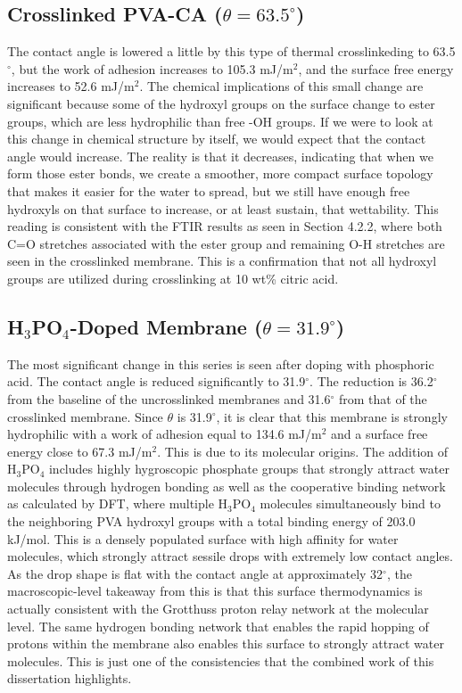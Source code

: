 \documentclass[12pt,a4paper]{report}
\begin{document}
\subsection{Crosslinked PVA-CA (\(\theta = 63.5^\circ\))}
The contact angle is lowered a little by this type of thermal crosslinkeding to 63.5\(^\circ\), but the work of adhesion increases to 105.3 mJ/m\(^2\), and the surface free energy increases to 52.6 mJ/m\(^2\). The chemical implications of this small change are significant because some of the hydroxyl groups on the surface change to ester groups, which are less hydrophilic than free -OH groups. If we were to look at this change in chemical structure by itself, we would expect that the contact angle would increase. The reality is that it decreases, indicating that when we form those ester bonds, we create a smoother, more compact surface topology that makes it easier for the water to spread, but we still have enough free hydroxyls on that surface to increase, or at least sustain, that wettability.\cite{35,53}
This reading is consistent with the FTIR results as seen in Section 4.2.2, where both C=O stretches associated with the ester group and remaining O-H stretches are seen in the crosslinked membrane. This is a confirmation that not all hydroxyl groups are utilized during crosslinking at 10 wt\% citric acid.

\subsection{H\(_3\)PO\(_4\)-Doped Membrane (\(\theta = 31.9^\circ\))}
The most significant change in this series is seen after doping with phosphoric acid. The contact angle is reduced significantly to 31.9\(^\circ\). The reduction is 36.2\(^\circ\) from the baseline of the uncrosslinked membranes and 31.6\(^\circ\) from that of the crosslinked membrane. Since \(\theta\) is 31.9\(^\circ\), it is clear that this membrane is strongly hydrophilic with a work of adhesion equal to 134.6 mJ/m\(^2\) and a surface free energy close to 67.3 mJ/m\(^2\).
This is due to its molecular origins. The addition of H\(_3\)PO\(_4\) includes highly hygroscopic phosphate groups that strongly attract water molecules through hydrogen bonding as well as the cooperative binding network as calculated by DFT, where multiple H\(_3\)PO\(_4\) molecules simultaneously bind to the neighboring PVA hydroxyl groups with a total binding energy of 203.0 kJ/mol. This is a densely populated surface with high affinity for water molecules, which strongly attract sessile drops with extremely low contact angles.\cite{21,55} As the drop shape is flat with the contact angle at approximately 32\(^\circ\), the macroscopic-level takeaway from this is that this surface thermodynamics is actually consistent with the Grotthuss proton relay network at the molecular level. The same hydrogen bonding network that enables the rapid hopping of protons within the membrane also enables this surface to strongly attract water molecules. This is just one of the consistencies that the combined work of this dissertation highlights.\cite{21,55,71}
\end{document}
